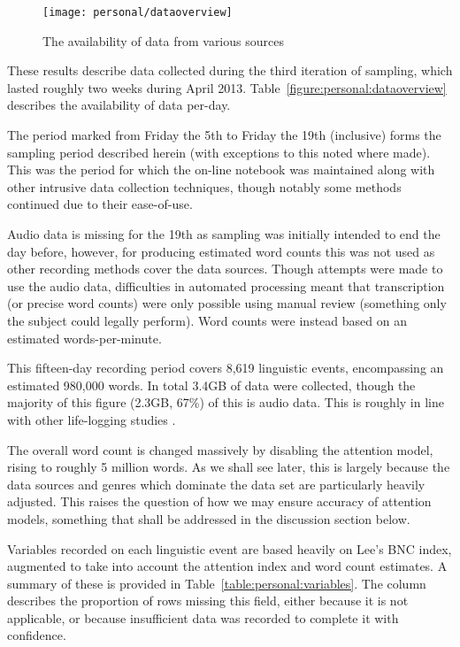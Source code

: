 

\begin{figure}[hp]
    \centering
    \begin{sideways}
        \texttt{[image: personal/dataoverview]}
    \end{sideways}
    \caption{The availability of data from various sources}
    \label{fig:personal:dataoverview}
\end{figure}


These results describe data collected during the third iteration of sampling, which lasted roughly two weeks during April 2013.  Table~\ref{figure:personal:dataoverview} describes the availability of data per-day.

The period marked from Friday the 5th to Friday the 19th (inclusive) forms the sampling period described herein (with exceptions to this noted where made).  This was the period for which the on-line notebook was maintained along with other intrusive data collection techniques, though notably some methods continued due to their ease-of-use.

Audio data is missing for the 19th as sampling was initially intended to end the day before, however, for producing estimated word counts this was not used as other recording methods cover the data sources.  Though attempts were made to use the audio data, difficulties in automated processing meant that transcription (or precise word counts) were only possible using manual review (something only the subject could legally perform).  Word counts were instead based on an estimated words-per-minute.


This fifteen-day recording period covers 8,619 linguistic events, encompassing an estimated 980,000 words.  In total 3.4GB of data were collected, though the majority of this figure (2.3GB, 67\%) of this is audio data.  This is roughly in line with other life-logging studies .

The overall word count is changed massively by disabling the attention model, rising to roughly 5 million words.  As we shall see later, this is largely because the data sources and genres which dominate the data set are particularly heavily adjusted.  This raises the question of how we may ensure accuracy of attention models, something that shall be addressed in the discussion section below.




Variables recorded on each linguistic event are based heavily on Lee's BNC index, augmented to take into account the attention index and word count estimates.  A summary of these is provided in Table~\ref{table:personal:variables}.  The  column describes the proportion of rows missing this field, either because it is not applicable, or because insufficient data was recorded to complete it with confidence.

